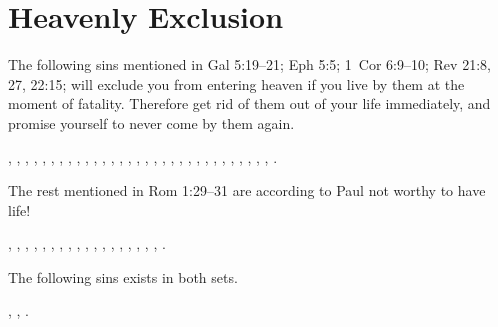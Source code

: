\section{Heavenly Exclusion}

The following sins mentioned in Gal 5:19--21; Eph 5:5; 1~Cor 6:9--10; Rev 21:8, 27, 22:15; will exclude you from entering heaven if you live by them at the moment of fatality. Therefore get rid of them out of your life immediately, and promise yourself to never come by them again.

,
,
,
,
,
,
,
,
,
,
,
,
,
,
,
,
,
,
,
,
,
,
,
,
,
,
,
,
,
,
,
.

The rest mentioned in Rom 1:29--31 are according to Paul not worthy to have life!

, 
, 
, 
, 
, 
, 
, 
, 
, 
, 
, 
, 
, 
, 
, 
, 
, 
, 
.

The following sins exists in both sets.

, %
, %
. %

